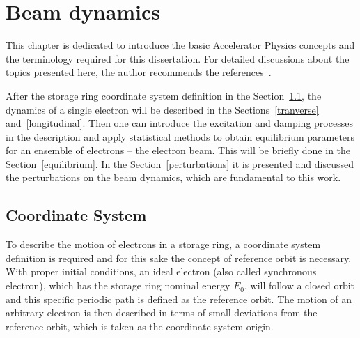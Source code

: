 \chapter{Beam dynamics}
This chapter is dedicated to introduce the basic Accelerator Physics concepts and the terminology required for this dissertation. For detailed discussions about the topics presented here, the author recommends the references~\cite{sands1970physics, wiedemann2007physics}.

After the storage ring coordinate system definition in the Section~\ref{coord}, the dynamics of a single electron will be described in the Sections~\ref{tranverse} and~\ref{longitudinal}. Then one can introduce the excitation and damping processes in the description and apply statistical methods to obtain equilibrium parameters for an ensemble of electrons -- the electron beam. This will be briefly done in the Section~\ref{equilibrium}. In the Section~\ref{perturbations} it is presented and discussed the perturbations on the beam dynamics, which are fundamental to this work.
\section{Coordinate System}\label{coord}
To describe the motion of electrons in a storage ring, a coordinate system definition is required and for this sake the concept of reference orbit is necessary. With proper initial conditions, an ideal electron (also called synchronous electron), which has the storage ring nominal energy $E_0$, will follow a closed orbit and this specific periodic path is defined as the reference orbit. The motion of an arbitrary electron is then described in terms of small deviations from the reference orbit, which is taken as the coordinate system origin. 

